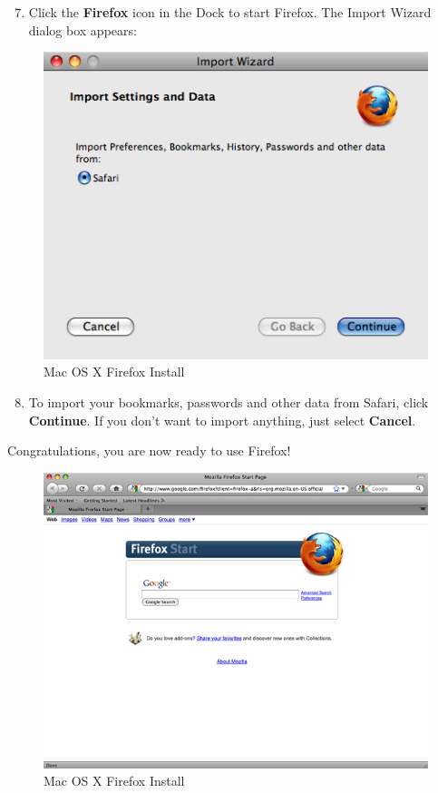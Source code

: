 \begin{enumerate}[1.]
\setcounter{enumi}{6}
\item
  Click the \textbf{Firefox} icon in the Dock to start Firefox. The
  Import Wizard dialog box appears:
\end{enumerate}
\begin{figure}[htbp]
\centering
\includegraphics{ff_mac_inst_5.png}
\caption{Mac OS X Firefox Install}
\end{figure}

\begin{enumerate}[1.]
\setcounter{enumi}{7}
\item
  To import your bookmarks, passwords and other data from Safari, click
  \textbf{Continue}. If you don't want to import anything, just select
  \textbf{Cancel}.
\end{enumerate}
Congratulations, you are now ready to use Firefox!

\begin{figure}[htbp]
\centering
\includegraphics{ff_mac_inst_8.png}
\caption{Mac OS X Firefox Install}
\end{figure}

